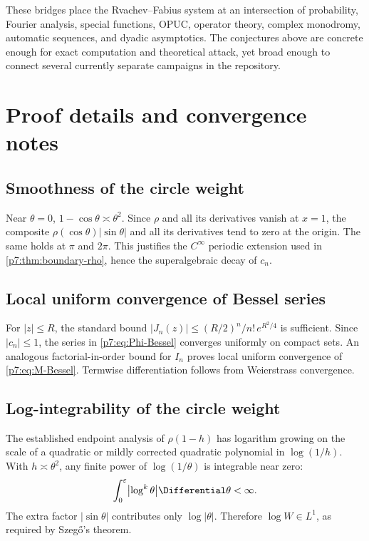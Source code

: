\documentclass[11pt]{article}
\theoremstyle{definition}
\theoremstyle{remark}
\begin{document}
These bridges place the Rvachev--Fabius system at an intersection of probability,
Fourier analysis, special functions, OPUC, operator theory, complex monodromy, automatic
sequences, and dyadic asymptotics. The conjectures above are concrete enough for exact
computation and theoretical attack, yet broad enough to connect several currently separate
campaigns in the repository.

\appendix

\section{Proof details and convergence notes}
\label{p7:app:proofs}

\subsection{Smoothness of the circle weight}

Near \(\theta=0\), \(1-\cos\theta\asymp\theta^2\). Since \(\rho\) and all its derivatives
vanish at \(x=1\), the composite \(\rho(\cos\theta)|\sin\theta|\) and all its derivatives tend
to zero at the origin. The same holds at \(\pi\) and \(2\pi\). This justifies the
\(C^\infty\) periodic extension used in \cref{p7:thm:boundary-rho}, hence the superalgebraic
decay of \(c_n\).

\subsection{Local uniform convergence of Bessel series}

For \(|z|\le R\), the standard bound \(|J_n(z)|\le (R/2)^n/n!\,e^{R^2/4}\) is sufficient.
Since \(|c_n|\le1\), the series in \eqref{p7:eq:Phi-Bessel} converges uniformly on compact sets.
An analogous factorial-in-order bound for \(I_n\) proves local uniform convergence of
\eqref{p7:eq:M-Bessel}. Termwise differentiation follows from Weierstrass convergence.

\subsection{Log-integrability of the circle weight}

The established endpoint analysis of \(\rho(1-h)\) has logarithm growing on the scale of a
quadratic or mildly corrected quadratic polynomial in \(\log(1/h)\). With
\(h\asymp\theta^2\), any finite power of \(\log(1/\theta)\) is integrable near zero:
\[
 \int_0^\varepsilon \bigl|\log^k\theta\bigr|\Differential\theta<\infty.
\]
The extra factor \(|\sin\theta|\) contributes only \(\log|\theta|\). Therefore
\(\log W\in L^1\), as required by Szeg\H{o}'s theorem.
\end{document}
